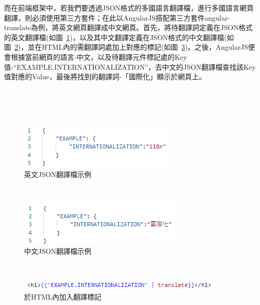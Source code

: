 而在前端框架中，若我們要透過JSON格式的多國語言翻譯檔，進行多國語言網頁翻譯，則必須使用第三方套件；在此以AngularJS\cite{angularjs}搭配第三方套件angular-translate\cite{angular-translate}為例，將英文網頁翻譯成中文網頁。首先，將待翻譯詞定義在JSON格式的英文翻譯檔(如圖~\ref{angular-translate英文JSON翻譯檔})，以及其中文翻譯定義在JSON格式的中文翻譯檔(如圖~\ref{angular-translate中文JSON翻譯檔})，並在HTML內的需翻譯詞處加上對應的標記(如圖~\ref{HTML翻譯標記})。之後，AngularJS便會根據當前網頁的語言-中文，以及待翻譯元件標記處的Key值-“EXAMPLE.INTERNATIONALIZATION”，去中文的JSON翻譯檔查找該Key值對應的Value，最後將找到的翻譯詞-「國際化」顯示於網頁上。

\hspace*{\fill} \\
\\ \hspace*{\fill} \\
\begin{figure}[H]
    \centering
    \includegraphics[width= .6\textwidth]{../論文截圖/angular-translate英文JSON翻譯檔.png}
    \caption{英文JSON翻譯檔示例}
    \label{angular-translate英文JSON翻譯檔}
\end{figure}

\hspace*{\fill} \\
\begin{figure}[H]
    \centering
    \includegraphics[width= .6\textwidth]{../論文截圖/angular-translate中文JSON翻譯檔.png}
    \caption{中文JSON翻譯檔示例}
    \label{angular-translate中文JSON翻譯檔}
\end{figure}

\hspace*{\fill} \\
\begin{figure}[H]
    \centering
    \includegraphics[width= .8\textwidth]{../論文截圖/HTML翻譯標記.png}
    \caption{於HTML內加入翻譯標記}
    \label{HTML翻譯標記}
\end{figure}

